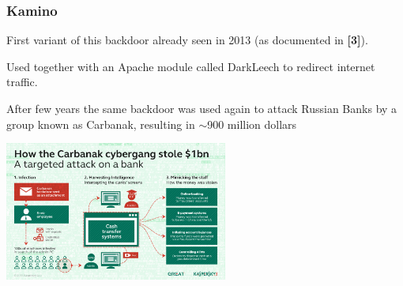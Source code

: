 \begin{frame}
	\frametitle{Kamino}
	
	First variant of this backdoor already seen in 2013 (as documented in \textbf{[3]}).
	
	\medskip
	
	Used together with an Apache module called DarkLeech to redirect internet traffic.
	
	\medskip
	
	After few years the same backdoor was used again to attack Russian Banks by a group known as Carbanak, resulting in $\sim$900 million dollars 
	
	
   \begin{center}    
   \includegraphics[width=0.55\textwidth]{images/Carbanak}
   \end{center}

\end{frame}
